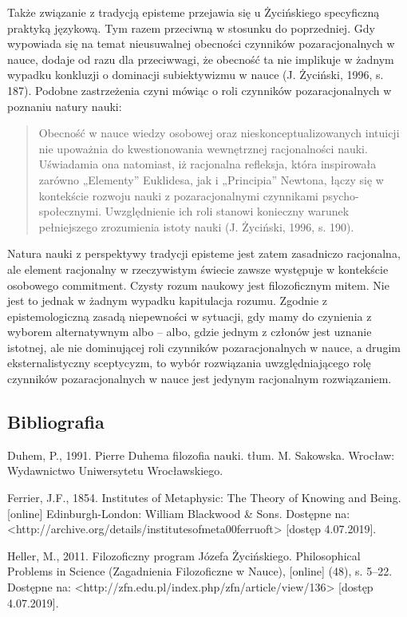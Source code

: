 \documentclass{article}
\begin{document}
Także związanie z tradycją episteme przejawia się u Życińskiego specyficzną praktyką językową. Tym razem przeciwną w
stosunku do poprzedniej. Gdy wypowiada się na temat nieusuwalnej obecności czynników pozaracjonalnych w nauce, dodaje
od razu  dla przeciwwagi, że obecność ta nie implikuje w żadnym wypadku konkluzji o dominacji subiektywizmu w nauce
\label{ref:RND5RKyXkJozz}(J. Życiński, 1996, s. 187). Podobne zastrzeżenia czyni  mówiąc o roli czynników
pozaracjonalnych w poznaniu natury nauki:

\begin{quotation}
Obecność w nauce wiedzy osobowej oraz nieskonceptualizowanych intuicji nie upoważnia do kwestionowania wewnętrznej
racjonalności nauki. Uświadamia ona natomiast, iż racjonalna refleksja, która inspirowała zarówno „Elementy” Euklidesa,
jak i „Principia” Newtona, łączy się w kontekście rozwoju nauki z pozaracjonalnymi czynnikami psycho-społecznymi.
Uwzględnienie ich roli stanowi konieczny warunek pełniejszego zrozumienia istoty nauki \label{ref:RND6rPInFRHqu}(J.
Życiński, 1996, s. 190). 

\end{quotation}
Natura nauki z perspektywy tradycji episteme jest zatem zasadniczo racjonalna, ale element racjonalny w rzeczywistym
świecie zawsze występuje w kontekście osobowego commitment. Czysty rozum naukowy jest filozoficznym mitem. Nie jest to
jednak w żadnym wypadku kapitulacja rozumu. Zgodnie z epistemologiczną zasadą niepewności w sytuacji, gdy mamy do
czynienia z wyborem alternatywnym albo – albo, gdzie jednym z członów jest uznanie istotnej, ale nie dominującej roli
czynników pozaracjonalnych w nauce, a drugim eksternalistyczny sceptycyzm, to wybór rozwiązania uwzględniającego rolę
czynników pozaracjonalnych w nauce jest jedynym racjonalnym rozwiązaniem.

\subsection{Bibliografia}
Duhem, P., 1991. Pierre Duhema filozofia nauki. tłum. M. Sakowska. Wrocław: Wydawnictwo Uniwersytetu Wrocławskiego.

Ferrier, J.F., 1854. Institutes of Metaphysic: The Theory of Knowing and Being. [online] Edinburgh-London: William
Blackwood \& Sons. Dostępne na: {\textless}http://archive.org/details/institutesofmeta00ferruoft{\textgreater} [dostęp
4.07.2019].

Heller, M., 2011. Filozoficzny program Józefa Życińskiego. Philosophical Problems in Science (Zagadnienia Filozoficzne w
Nauce), [online] (48), s. 5–22. Dostępne na: {\textless}http://zfn.edu.pl/index.php/zfn/article/view/136{\textgreater}
[dostęp 4.07.2019].
\end{document}
